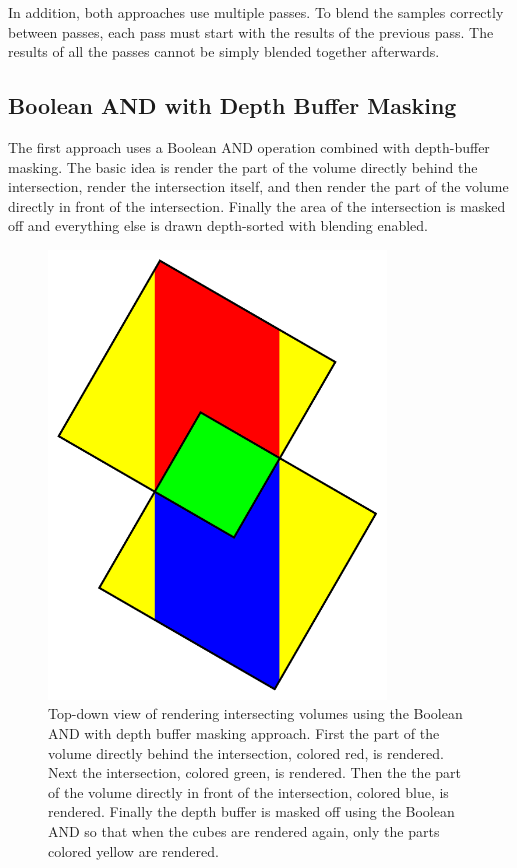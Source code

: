 \documentclass{article}
\begin{document}
In addition, both approaches use multiple passes.  To blend the samples
correctly between passes, each pass must start with the results of the previous
pass.  The results of all the passes cannot be simply blended together
afterwards.

\subsection{Boolean AND with Depth Buffer Masking}

The first approach uses a Boolean AND operation combined with depth-buffer
masking.  The basic idea is render the part of the volume directly behind the
intersection, render the intersection itself, and then render the part of the
volume directly in front of the intersection.  Finally the area of the
intersection is masked off and everything else is drawn depth-sorted with
blending enabled.

\begin{figure}
\centering
\includegraphics[width=0.8\textwidth]{boolean-and.pdf}
\caption{
Top-down view of rendering intersecting volumes using the Boolean AND with depth
buffer masking approach.  First the part of the volume directly behind the
intersection, colored red, is rendered.  Next the intersection, colored green,
is rendered.  Then the the part of the volume directly in front of the
intersection, colored blue, is rendered.  Finally the depth buffer is masked off
using the Boolean AND so that when the cubes are rendered again, only the parts
colored yellow are rendered.
}
\label{boolean-and}
\end{figure}
\end{document}
